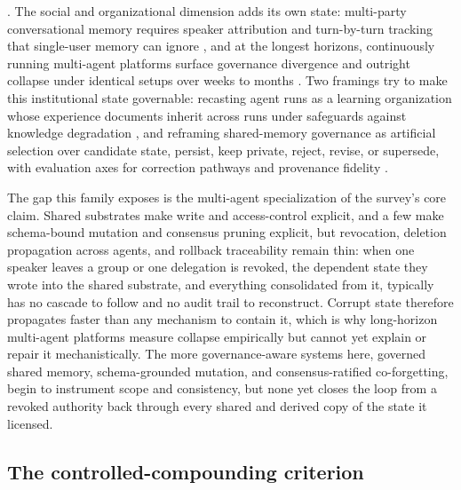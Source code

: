 \citep{khushiyant2025collectivememory}. The social and organizational dimension adds its own state: multi-party conversational memory requires speaker attribution and turn-by-turn tracking that single-user memory can ignore \citep{yang2026groupmembenchbenchmarkingllmagent}, and at the longest horizons, continuously running multi-agent platforms surface governance divergence and outright collapse under identical setups over weeks to months \citep{akkil2026emergenceworld}. Two framings try to make this institutional state governable: recasting agent runs as a learning organization whose experience documents inherit across runs under safeguards against knowledge degradation \citep{xie2026forage}, and reframing shared-memory governance as artificial selection over candidate state, persist, keep private, reject, revise, or supersede, with evaluation axes for correction pathways and provenance fidelity \citep{cuadros2026governedselection}.

The gap this family exposes is the multi-agent specialization of the survey's core claim. Shared substrates make write and access-control explicit, and a few make schema-bound mutation and consensus pruning explicit, but revocation, deletion propagation across agents, and rollback traceability remain thin: when one speaker leaves a group or one delegation is revoked, the dependent state they wrote into the shared substrate, and everything consolidated from it, typically has no cascade to follow and no audit trail to reconstruct. Corrupt state therefore propagates faster than any mechanism to contain it, which is why long-horizon multi-agent platforms measure collapse empirically but cannot yet explain or repair it mechanistically. The more governance-aware systems here, governed shared memory, schema-grounded mutation, and consensus-ratified co-forgetting, begin to instrument scope and consistency, but none yet closes the loop from a revoked authority back through every shared and derived copy of the state it licensed.

\subsection{The controlled-compounding criterion}


